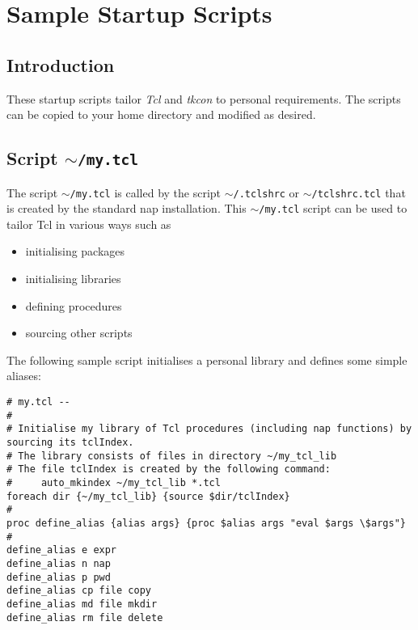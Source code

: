     \section{Sample Startup Scripts}
    \label{Sample-Startup-Scripts}

  \subsection{
    \label{Introduction}Introduction
  }
These startup scripts tailor 
  \emph{Tcl} and 
  \emph{tkcon} to personal requirements. The scripts can be copied to
  your home directory and modified as desired.
  \subsection{
    \label{my}Script \texttt{$\sim$/my.tcl}
  }
The script 
  \texttt{$\sim$/my.tcl} is called by the script 
  \texttt{$\sim$/.tclshrc} or 
  \texttt{$\sim$/tclshrc.tcl} that is created by the standard nap
  installation. This 
  \texttt{$\sim$/my.tcl} script can be used to tailor Tcl in various
  ways such as
  \begin{itemize}
    \item initialising packages
    \item initialising libraries
    \item defining procedures
    \item sourcing other scripts
  \end{itemize}
  \par The following sample script initialises a personal library and
  defines some simple aliases:
  \begin{verbatim}
# my.tcl --
#
# Initialise my library of Tcl procedures (including nap functions) by
sourcing its tclIndex.
# The library consists of files in directory ~/my_tcl_lib
# The file tclIndex is created by the following command:
#     auto_mkindex ~/my_tcl_lib *.tcl
foreach dir {~/my_tcl_lib} {source $dir/tclIndex}
#
proc define_alias {alias args} {proc $alias args "eval $args \$args"}
#
define_alias e expr
define_alias n nap
define_alias p pwd
define_alias cp file copy
define_alias md file mkdir
define_alias rm file delete
\end{verbatim}

